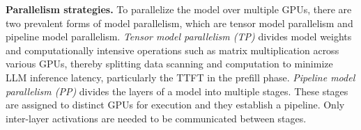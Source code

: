 \label{subsec:distributedllmdeployment}


\noindent \textbf{Parallelism strategies.}
To parallelize the model over multiple GPUs, there are two prevalent forms of model parallelism, which are tensor model parallelism and pipeline model parallelism.
\textit{Tensor model parallelism (TP)} \cite{shoeybi2019megatron,nagrecha2021model} divides model weights and computationally intensive operations such as matrix multiplication across various GPUs, thereby splitting data scanning and computation to minimize LLM inference latency, particularly the TTFT in the prefill phase. 
\textit{Pipeline model parallelism (PP)} \cite{huang2019gpipe,narayanan2019pipedream} divides the layers of a model into multiple stages. These stages are assigned to distinct GPUs for execution and they establish a pipeline. Only inter-layer activations are needed to be communicated between stages. 


